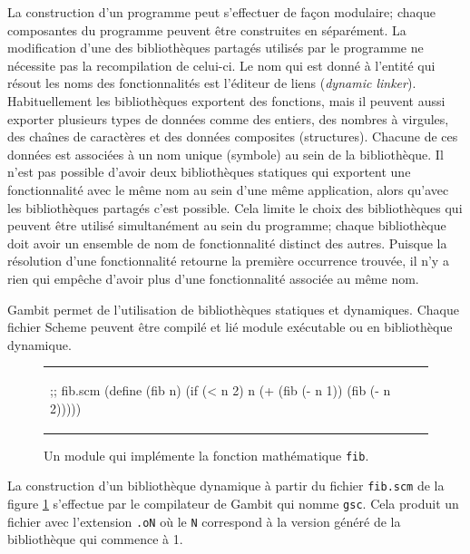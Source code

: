 La construction d'un programme peut s'effectuer de façon modulaire; chaque
composantes du programme peuvent être construites en séparément.  La
modification d'une des bibliothèques partagés utilisés par
le programme ne nécessite pas la recompilation de celui-ci. Le nom qui est
donné à l'entité qui résout les noms des fonctionnalités est l'éditeur de liens (\textit{dynamic linker}).
Habituellement les bibliothèques exportent des fonctions, mais il peuvent aussi
exporter plusieurs types de données comme des entiers, des nombres à virgules,
des chaînes de caractères et des données composites (structures). Chacune de ces données est
associées à un nom unique (symbole) au sein de la bibliothèque.
Il n'est pas possible d'avoir deux bibliothèques statiques qui exportent une
fonctionnalité avec le même nom au sein d'une même application, alors qu'avec
les bibliothèques partagés c'est possible. Cela limite le choix des
bibliothèques qui peuvent être utilisé simultanément au sein du programme;
chaque bibliothèque doit avoir un ensemble de nom de fonctionnalité distinct
des autres. Puisque la résolution d'une fonctionnalité retourne la première
occurrence trouvée, il n'y a rien qui empêche d'avoir plus d'une fonctionnalité
associée au même nom.

Gambit permet de l'utilisation de bibliothèques statiques et dynamiques.
Chaque fichier Scheme peuvent être compilé et lié module exécutable ou
en bibliothèque dynamique.

\begin{center}
\begin{figure}[ht]
  \begin{tabular}{l}
    \begin{mplisting}{0.5}
;; fib.scm
(define (fib n)
  (if (< n 2)
      n
      (+ (fib (- n 1))
         (fib (- n 2)))))
\end{mplisting}
  \end{tabular}
  \caption{Un module qui implémente la fonction mathématique \texttt{fib}.}
  \label{fig:basic_fib_module}
\end{figure}
\end{center}

\vspace{-20pt}
La construction d'un bibliothèque dynamique à partir du fichier \texttt{fib.scm}
de la figure \ref{fig:basic_fib_module} s'effectue par le compilateur de Gambit
qui nomme \texttt{gsc}. Cela produit un fichier avec l'extension \texttt{.oN}
où le \texttt{N} correspond à la version généré de la bibliothèque qui commence à 1.

